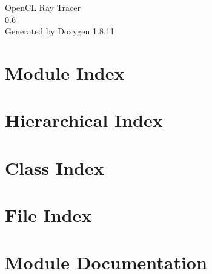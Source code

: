 \documentclass[twoside]{book}
\newcommand{\+}{\discretionary{\mbox{\scriptsize$\hookleftarrow$}}{}{}}
\newcommand{\clearemptydoublepage}{%
  \newpage{\pagestyle{empty}\cleardoublepage}%
}
\begin{document}
\hypersetup{pageanchor=false,
             bookmarksnumbered=true,
             pdfencoding=unicode
            }
\begin{titlepage}
\vspace*{7cm}
\begin{center}%
{\Large Open\+CL Ray Tracer \\[1ex]\large 0.\+6 }\\
\vspace*{1cm}
{\large Generated by Doxygen 1.8.11}\\
\end{center}
\end{titlepage}
\clearemptydoublepage
\tableofcontents
\clearemptydoublepage
{}
\hypersetup{pageanchor=true}

\chapter{Module Index}

\chapter{Hierarchical Index}

\chapter{Class Index}

\chapter{File Index}

\chapter{Module Documentation}






\end{document}
